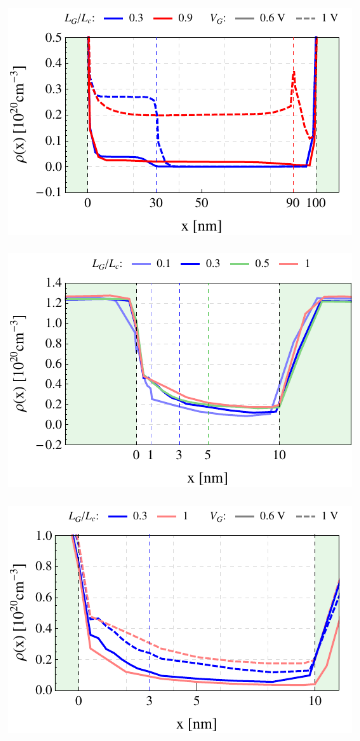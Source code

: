 \documentclass[11pt, a4paper]{article}
\begin{document}
\begin{figure}[b]
\begin{subfigure}{0.245\linewidth}
		\caption{}\label{fig:3:2b}
	\end{subfigure}
	\begin{subfigure}{0.245\linewidth}
		\centering
		\includegraphics[width=1\linewidth]{ndxPG100vg0610}
		\caption{}\label{fig:3:4b}
	\end{subfigure}
	\begin{subfigure}{0.245\linewidth}
		\centering
		\includegraphics[width=1\linewidth]{ndxPG10}
		\caption{}\label{fig:3:3b}
	\end{subfigure}
	\begin{subfigure}{0.245\linewidth}
		\centering
		\includegraphics[width=1\linewidth]{ndxPG10vg0610_new}

\end{subfigure}
\end{figure}
\end{document}
